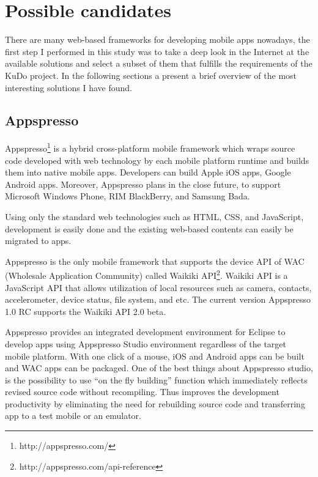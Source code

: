\documentclass[a4paper,12pt]{book}
\begin{document}
\section{Possible candidates}
\label{sec:candidates}
 
There are many web-based frameworks for developing mobile apps nowadays, the first step I performed in this study was to take a deep look in the Internet at the available solutions and select a subset of them that fulfills the requirements of the KuDo project. In the following sections a present a brief overview of the most interesting solutions I have found.
 
\subsection{Appspresso}
\label{Appspresso} 
 
Appspresso\footnote{http://appspresso.com/}  is a hybrid cross-platform mobile framework which wraps source code developed with web technology by each mobile platform runtime and builds them into native mobile apps. Developers can build Apple iOS apps, Google Android apps. Moreover, Appspresso plans in the close future, to support Microsoft Windows Phone, RIM BlackBerry, and Samsung Bada. 

Using only the standard web technologies such as HTML, CSS, and JavaScript, development is easily done  and the existing web-based contents can easily be migrated to apps.

Appspresso is the only mobile framework that supports the device API of WAC (Wholesale Application Community) called Waikiki API\footnote{http://appspresso.com/api-reference}. Waikiki API is a JavaScript API that allows utilization of local resources such as camera, contacts, accelerometer, device status, file system, and etc. The current version Appspresso 1.0 RC supports the Waikiki API 2.0 beta.

Appspresso provides an integrated development environment for Eclipse to develop apps using Appspresso Studio environment regardless of the target mobile platform. With one click of a mouse, iOS and Android apps can be built and WAC apps can be packaged. One of the best things about Appspresso studio, is the possibility to use “on the fly building” function which immediately reflects revised source code without recompiling. Thus improves the development productivity by eliminating the need for rebuilding source code and transferring app to a test mobile or an emulator. 
\end{document}
